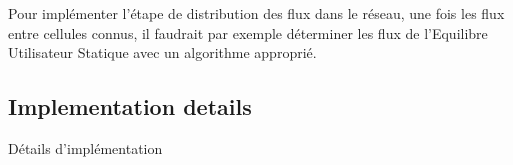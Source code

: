 Pour implémenter l'étape de distribution des flux dans le réseau, une fois les flux entre cellules connus, il faudrait par exemple déterminer les flux de l'Equilibre Utilisateur Statique avec un algorithme approprié.






\subsection{Implementation details}{Détails d'implémentation}



